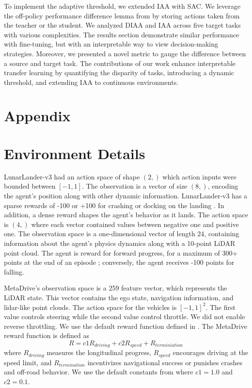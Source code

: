 \documentclass{article} %
\begin{document}
To implement the adaptive threshold, we extended IAA with SAC. We leverage the off-policy performance difference lemma from \cite{shenfeld2023tgrl} by storing actions taken from the teacher or the student. We analyzed DIAA and IAA across five target tasks with various complexities. The results section demonstrate similar performance with fine-tuning, but with an interpretable way to view decision-making strategies. Moreover, we presented a novel metric to gauge the difference between a source and target task. The contributions of our work enhance interpretable transfer learning by quantifying the disparity of tasks, introducing a dynamic threshold, and extending IAA to continuous environments.





\appendix
\section{Appendix}

\section{Environment Details}
\label{appx:envs}

LunarLander-v3 had an action space of shape $(2,)$ which action inputs were bounded between $[-1,1].$ The observation is a vector of size $(8,)$, encoding the agent's position along with other dynamic information. LunarLander-v3 has a sparse rewards of -100 or +100 for crashing or docking on the landing \cite{towersgym2024}. In addition, a dense reward shapes the agent's behavior as it lands. The action space is $(4,)$ where each vector contained values between negative one and positive one. The observation space is a one-dimensional vector of length 24, containing information about the agent's physics dynamics along with a 10-point LiDAR point cloud. The agent is reward for forward progress, for a maximum of 300+ points at the end of an episode \cite{towersgym2024}; conversely, the agent receives -100 points for falling. 

MetaDrive's observation space is a 259 feature vector, which represents the LiDAR state. This vector contains the ego state, navigation information, and lidar-like point clouds. The action space for the vehicles is $[-1,1]^2.$ The first value controls steering while the second value control throttle. We did not enable reverse throttling. We use the default reward function defined in \cite{li2022metadrive}. The MetaDrive reward function is defined as
\begin{equation}
    R = c1R_{driving} + c2 R_{speed} + R_{terminiation}
\label{eq:metadrive-rf}
\end{equation} where $R_{driving}$ measures the longitudinal progress, $R_{speed}$ encourages driving at the speed limit, and $R_{termination}$ incentivizes navigational success or punishes crashes and off-road behavior. We use the default constants from \cite{li2022metadrive} where $c1 = 1.0$ and $c2=0.1$.
\end{document}
